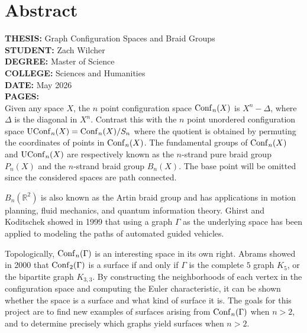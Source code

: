 \chapter*{Abstract}
{\bf THESIS:} Graph Configuration Spaces and Braid Groups
\\{\bf STUDENT:} Zach Wilcher
\\{\bf DEGREE:} Master of Science
\\{\bf COLLEGE:} Sciences and Humanities
\\{\bf DATE:} May 2026
\\{\bf PAGES:} \pageref{LastPage}
\\
Given any space \(X\), the \(n\) point configuration space \(\mathrm{Conf}_n(X)\) is 
\(X^n - \Delta\), where \(\Delta\) is the diagonal in \(X^n\). 
Contrast this with the \(n\) point unordered configuration space \(\mathrm{UConf}_n(X) = \mathrm{Conf}_n(X) / S_n\)
where the quotient is obtained by permuting the coordinates of points in \(\mathrm{Conf}_n(X)\).
The fundamental groups of \(\mathrm{Conf}_n(X)\) and \(\mathrm{UConf}_n(X)\) are respectively known as the \(n\)-strand pure braid group
\(P_n(X)\) and the \(n\)-strand braid group \(B_n(X)\).
The base point will be omitted since the considered spaces are path connected.

\(B_n(\mathbb{R}^2)\) is also known as the Artin braid group and has applications
in motion planning, fluid mechanics, and quantum information theory.
Ghirst and Koditschek showed in 1999 that using a graph \(\Gamma\) as the underlying space has 
been applied to modeling the paths of automated guided vehicles.

Topologically, \(\mathrm{Conf}_n(\Gamma)\) is an interesting space in its own right. 
Abrams showed in 2000 that \(\mathrm{Conf}_2(\Gamma)\) is a surface if and only if \(\Gamma\)
is the complete \(5\) graph \(K_5\), or the bipartite graph \(K_{3,3}\).
By constructing the neighborhoods of each vertex in the configuration space
and computing the Euler characteristic, it can be shown
whether the space is a surface and what kind of surface it is.
The goals for this project are to 
find new examples of surfaces arising from \(\mathrm{Conf}_n(\Gamma)\) when \(n > 2\),
and to determine precisely which graphs yield surfaces when \(n > 2\).



